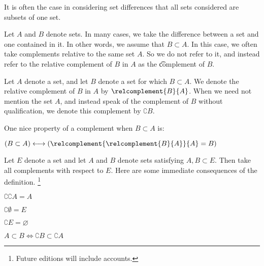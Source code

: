 

It is often the case in considering set differences that all sets considered are subsets of one set.


Let $A$ and $B$ denote sets.
In many cases, we take the difference between a set and one contained in it.
In other words, we assume that $B \subset A$.
In this case, we often take complements relative to the same set $A$.
So we do not refer to it, and instead refer to the relative complement of $B$ in $A$ as the \t{complement} of $B$.


Let $A$ denote a set, and let $B$ denote a set for which $B \subset A$.
We denote the relative complement of $B$ in $A$ by $\relcomplement{B}{A}$.
When we need not mention the set $A$, and instead speak of the complement of $B$ without qualification, we denote this complement by $\complement{B}$.


One nice property of a complement when $B \subset A$ is:
\begin{proposition}
$(B \subset A) \iff (\relcomplement{\relcomplement{B}{A}}{A} = B)$
\end{proposition}


Let $E$ denote a set and let $A$ and $B$ denote sets satisfying $A,B \subset E$.
Then take all complements with respect to $E$.
Here are some immediate consequences of the definition.
  \ifhmode\unskip\fi\footnote{
Future editions will include accounts.
  }

\begin{proposition}
$\complement{\complement{A}} = A$
\end{proposition}

\begin{proposition}
$\complement{\emptyset} = E$
\end{proposition}

\begin{proposition}
$\complement{E} = \varnothing$
\end{proposition}

\begin{proposition}
$A \subset B \iff \complement{B} \subset \complement{A}$
\end{proposition}
